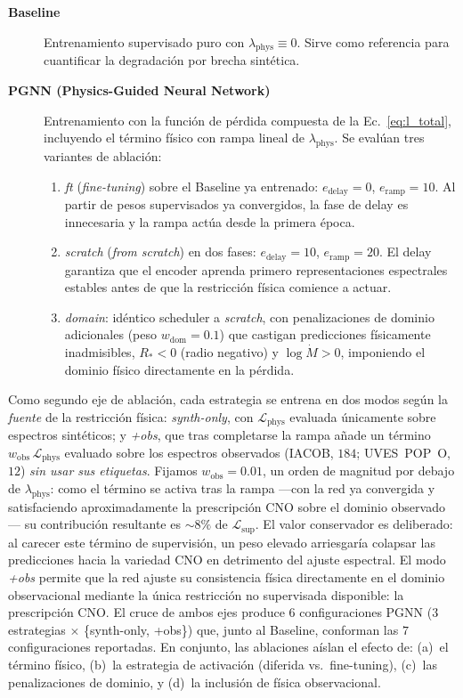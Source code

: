 \documentclass[sigconf,ACM]{acmart}
\begin{document}
\begin{description}
  \item[\textbf{Baseline}] Entrenamiento supervisado puro con $\lambda_{\mathrm{phys}} \equiv 0$. Sirve como referencia para cuantificar la degradación por brecha sintética.

  \item[\textbf{PGNN (Physics-Guided Neural Network)}] Entrenamiento con la función de pérdida compuesta de la Ec.~\eqref{eq:l_total}, incluyendo el término físico con rampa lineal de $\lambda_{\mathrm{phys}}$. Se evalúan tres variantes de ablación:
  \begin{enumerate}
    \item \emph{ft} (\emph{fine-tuning}) sobre el Baseline ya entrenado: $e_{\mathrm{delay}}=0$, $e_{\mathrm{ramp}}=10$. Al partir de pesos supervisados ya convergidos, la fase de delay es innecesaria y la rampa actúa desde la primera época.
    \item \emph{scratch} (\emph{from scratch}) en dos fases: $e_{\mathrm{delay}}=10$, $e_{\mathrm{ramp}}=20$. El delay garantiza que el encoder aprenda primero representaciones espectrales estables antes de que la restricción física comience a actuar.
    \item \emph{domain}: idéntico scheduler a \emph{scratch}, con penalizaciones de dominio adicionales (peso $w_{\mathrm{dom}}=0.1$) que castigan predicciones físicamente inadmisibles, $R_* < 0$ (radio negativo) y $\log \dot{M} > 0$, imponiendo el dominio físico directamente en la pérdida.
  \end{enumerate}

\end{description}
  
Como segundo eje de ablación, cada estrategia se entrena en dos modos según la \emph{fuente} de la restricción física: \emph{synth-only}, con $\mathcal{L}_\mathrm{phys}$ evaluada únicamente sobre espectros sintéticos; y \emph{+obs}, que tras completarse la rampa añade un término $w_\mathrm{obs}\,\mathcal{L}_\mathrm{phys}$ evaluado sobre los espectros observados (IACOB, $184$; UVES~POP~O, $12$) \emph{sin usar sus etiquetas}. Fijamos $w_\mathrm{obs}=0.01$, un orden de magnitud por debajo de $\lambda_\mathrm{phys}$: como el término se activa tras la rampa ---con la red ya convergida y satisfaciendo aproximadamente la prescripción CNO sobre el dominio observado--- su contribución resultante es ${\sim}8\%$ de $\mathcal{L}_\mathrm{sup}$. El valor conservador es deliberado: al carecer este término de supervisión, un peso elevado arriesgaría colapsar las predicciones hacia la variedad CNO en detrimento del ajuste espectral. El modo \emph{+obs} permite que la red ajuste su consistencia física directamente en el dominio observacional mediante la única restricción no supervisada disponible: la prescripción CNO. El cruce de ambos ejes produce $6$ configuraciones PGNN ($3$ estrategias $\times$ \{synth-only, +obs\}) que, junto al Baseline, conforman las $7$ configuraciones reportadas. En conjunto, las ablaciones aíslan el efecto de: (a)~el término físico, (b)~la estrategia de activación (diferida vs.\ fine-tuning), (c)~las penalizaciones de dominio, y (d)~la inclusión de física observacional.
\end{document}
